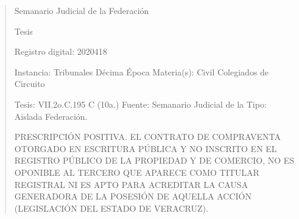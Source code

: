 \documentclass[11pt,a4paper]{article}
\begin{document}
\begin{quote}
                                                   Semanario Judicial de la Federación

                                                Tesis

 Registro digital: 2020418

 Instancia: Tribunales             Décima Época                            Materia(s): Civil
 Colegiados de Circuito

 Tesis: VII.2o.C.195 C (10a.)      Fuente: Semanario Judicial de la        Tipo: Aislada
                                   Federación.


PRESCRIPCIÓN POSITIVA. EL CONTRATO DE COMPRAVENTA OTORGADO EN ESCRITURA
PÚBLICA Y NO INSCRITO EN EL REGISTRO PÚBLICO DE LA PROPIEDAD Y DE COMERCIO,
NO ES OPONIBLE AL TERCERO QUE APARECE COMO TITULAR REGISTRAL NI ES APTO
PARA ACREDITAR LA CAUSA GENERADORA DE LA POSESIÓN DE AQUELLA ACCIÓN
(LEGISLACIÓN DEL ESTADO DE VERACRUZ).



\end{quote}
\end{document}
